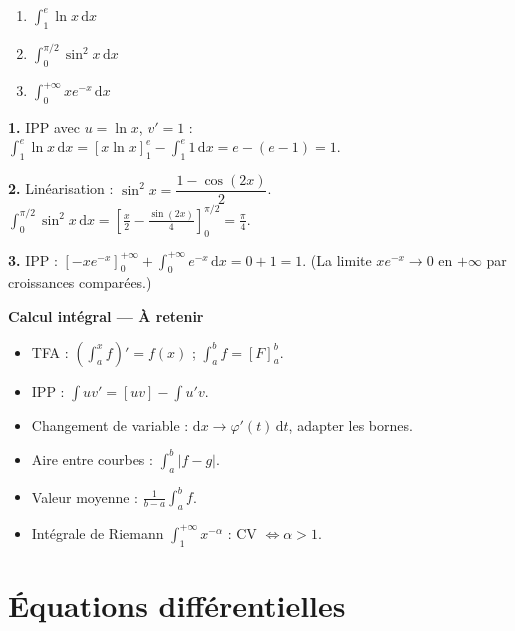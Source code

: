 \documentclass[11pt,a4paper,twoside]{book}
\begin{document}
\begin{exercicebox}
\begin{enumerate}
  \item $\displaystyle\int_1^e \ln x\,\mathrm{d}x$
  \item $\displaystyle\int_0^{\pi/2}\sin^2 x\,\mathrm{d}x$
  \item $\displaystyle\int_0^{+\infty} x e^{-x}\,\mathrm{d}x$
\end{enumerate}
\end{exercicebox}

\begin{correctionbox}[Correction]
\textbf{1.} IPP avec $u=\ln x$, $v'=1$ :
$\displaystyle\int_1^e\ln x\,\mathrm{d}x = [x\ln x]_1^e - \int_1^e 1\,\mathrm{d}x = e - (e-1) = 1$.

\textbf{2.} Linéarisation : $\sin^2 x = \dfrac{1-\cos(2x)}{2}$.
$\displaystyle\int_0^{\pi/2}\sin^2 x\,\mathrm{d}x = \left[\frac{x}{2}-\frac{\sin(2x)}{4}\right]_0^{\pi/2} = \frac{\pi}{4}$.

\textbf{3.} IPP : $[{-xe^{-x}}]_0^{+\infty}+\int_0^{+\infty}e^{-x}\,\mathrm{d}x = 0 + 1 = 1$.
(La limite $xe^{-x}\to0$ en $+\infty$ par croissances comparées.)
\end{correctionbox}

\begin{retenirbox}
\textbf{Calcul intégral — À retenir}
\begin{itemize}
  \item TFA : $\left(\int_a^x f\right)' = f(x)$ ; $\int_a^b f = [F]_a^b$.
  \item IPP : $\int uv' = [uv] - \int u'v$.
  \item Changement de variable : $\mathrm{d}x \to \varphi'(t)\,\mathrm{d}t$, adapter les bornes.
  \item Aire entre courbes : $\int_a^b|f-g|$.
  \item Valeur moyenne : $\frac{1}{b-a}\int_a^b f$.
  \item Intégrale de Riemann $\int_1^{+\infty}x^{-\alpha}$ : CV $\iff \alpha>1$.
\end{itemize}
\end{retenirbox}

\chapter{Équations différentielles}
\end{document}
